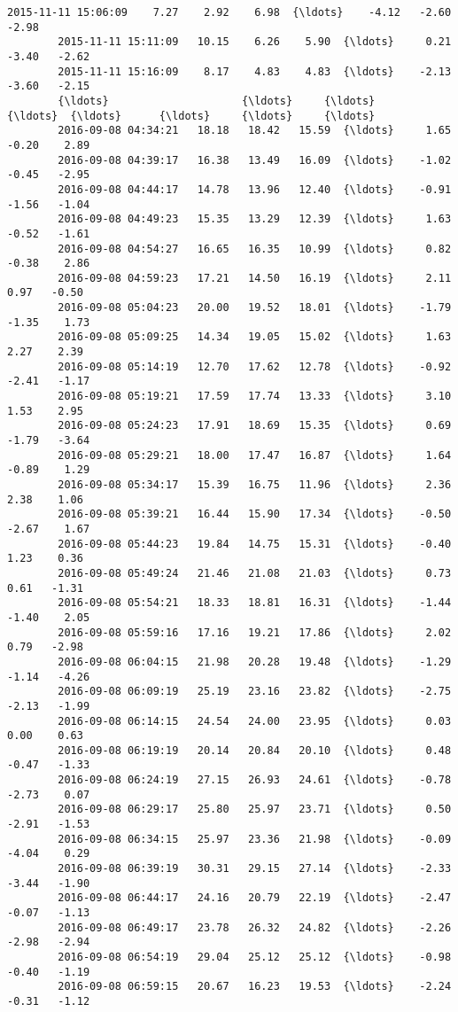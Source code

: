 \documentclass[a4paper,dvipdfmx]{jsarticle}
\begin{document}
\begin{Verbatim}[commandchars=\\\{\}]
        2015-11-11 15:06:09    7.27    2.92    6.98  {\ldots}    -4.12   -2.60   -2.98   
        2015-11-11 15:11:09   10.15    6.26    5.90  {\ldots}     0.21   -3.40   -2.62   
        2015-11-11 15:16:09    8.17    4.83    4.83  {\ldots}    -2.13   -3.60   -2.15   
        {\ldots}                     {\ldots}     {\ldots}     {\ldots}  {\ldots}      {\ldots}     {\ldots}     {\ldots}   
        2016-09-08 04:34:21   18.18   18.42   15.59  {\ldots}     1.65   -0.20    2.89   
        2016-09-08 04:39:17   16.38   13.49   16.09  {\ldots}    -1.02   -0.45   -2.95   
        2016-09-08 04:44:17   14.78   13.96   12.40  {\ldots}    -0.91   -1.56   -1.04   
        2016-09-08 04:49:23   15.35   13.29   12.39  {\ldots}     1.63   -0.52   -1.61   
        2016-09-08 04:54:27   16.65   16.35   10.99  {\ldots}     0.82   -0.38    2.86   
        2016-09-08 04:59:23   17.21   14.50   16.19  {\ldots}     2.11    0.97   -0.50   
        2016-09-08 05:04:23   20.00   19.52   18.01  {\ldots}    -1.79   -1.35    1.73   
        2016-09-08 05:09:25   14.34   19.05   15.02  {\ldots}     1.63    2.27    2.39   
        2016-09-08 05:14:19   12.70   17.62   12.78  {\ldots}    -0.92   -2.41   -1.17   
        2016-09-08 05:19:21   17.59   17.74   13.33  {\ldots}     3.10    1.53    2.95   
        2016-09-08 05:24:23   17.91   18.69   15.35  {\ldots}     0.69   -1.79   -3.64   
        2016-09-08 05:29:21   18.00   17.47   16.87  {\ldots}     1.64   -0.89    1.29   
        2016-09-08 05:34:17   15.39   16.75   11.96  {\ldots}     2.36    2.38    1.06   
        2016-09-08 05:39:21   16.44   15.90   17.34  {\ldots}    -0.50   -2.67    1.67   
        2016-09-08 05:44:23   19.84   14.75   15.31  {\ldots}    -0.40    1.23    0.36   
        2016-09-08 05:49:24   21.46   21.08   21.03  {\ldots}     0.73    0.61   -1.31   
        2016-09-08 05:54:21   18.33   18.81   16.31  {\ldots}    -1.44   -1.40    2.05   
        2016-09-08 05:59:16   17.16   19.21   17.86  {\ldots}     2.02    0.79   -2.98   
        2016-09-08 06:04:15   21.98   20.28   19.48  {\ldots}    -1.29   -1.14   -4.26   
        2016-09-08 06:09:19   25.19   23.16   23.82  {\ldots}    -2.75   -2.13   -1.99   
        2016-09-08 06:14:15   24.54   24.00   23.95  {\ldots}     0.03    0.00    0.63   
        2016-09-08 06:19:19   20.14   20.84   20.10  {\ldots}     0.48   -0.47   -1.33   
        2016-09-08 06:24:19   27.15   26.93   24.61  {\ldots}    -0.78   -2.73    0.07   
        2016-09-08 06:29:17   25.80   25.97   23.71  {\ldots}     0.50   -2.91   -1.53   
        2016-09-08 06:34:15   25.97   23.36   21.98  {\ldots}    -0.09   -4.04    0.29   
        2016-09-08 06:39:19   30.31   29.15   27.14  {\ldots}    -2.33   -3.44   -1.90   
        2016-09-08 06:44:17   24.16   20.79   22.19  {\ldots}    -2.47   -0.07   -1.13   
        2016-09-08 06:49:17   23.78   26.32   24.82  {\ldots}    -2.26   -2.98   -2.94   
        2016-09-08 06:54:19   29.04   25.12   25.12  {\ldots}    -0.98   -0.40   -1.19   
        2016-09-08 06:59:15   20.67   16.23   19.53  {\ldots}    -2.24   -0.31   -1.12   
        

\end{Verbatim}
\end{document}
